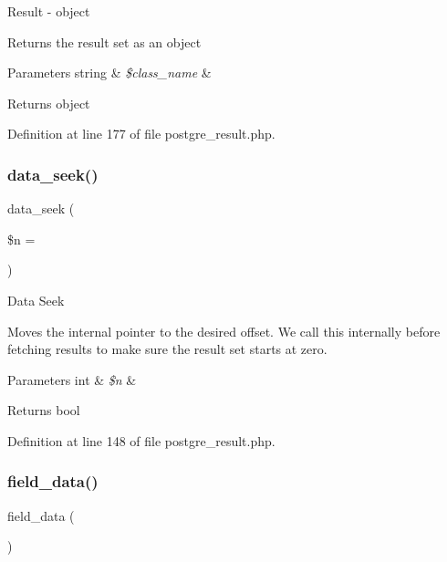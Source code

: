 Result -\/ object

Returns the result set as an object


\begin{DoxyParams}[1]{Parameters}
string & {\em \$class\+\_\+name} & \\
\hline
\end{DoxyParams}
\begin{DoxyReturn}{Returns}
object 
\end{DoxyReturn}


Definition at line 177 of file postgre\+\_\+result.\+php.

\mbox{\label{class_c_i___d_b__postgre__result_a8255ae91816e4206e29eb7581c5af0f1}} 
\subsubsection{\texorpdfstring{data\_seek()}{data\_seek()}}
{\footnotesize\ttfamily data\+\_\+seek (\begin{DoxyParamCaption}\item[{}]{\$n = {} }\end{DoxyParamCaption})}

Data Seek

Moves the internal pointer to the desired offset. We call this internally before fetching results to make sure the result set starts at zero.


\begin{DoxyParams}[1]{Parameters}
int & {\em \$n} & \\
\hline
\end{DoxyParams}
\begin{DoxyReturn}{Returns}
bool 
\end{DoxyReturn}


Definition at line 148 of file postgre\+\_\+result.\+php.

\mbox{\label{class_c_i___d_b__postgre__result_a84bffd65e53902ade1591716749a33e3}} 
\subsubsection{\texorpdfstring{field\_data()}{field\_data()}}
{\footnotesize\ttfamily field\+\_\+data (\begin{DoxyParamCaption}{ }\end{DoxyParamCaption})}

